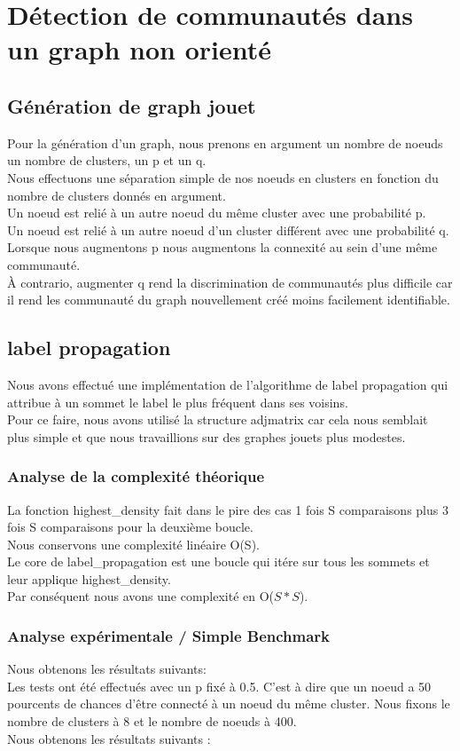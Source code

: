 \documentclass[a4paper,10pt]{report}
\begin{document}
\chapter{Détection de communautés dans un graph non orienté}
\section{Génération de graph jouet}
Pour la génération d'un graph, nous prenons en argument un nombre de noeuds un nombre de clusters, un p et un q.
\\
Nous effectuons une séparation simple de nos noeuds en clusters en fonction du nombre de clusters donnés en argument.
\\
Un noeud est relié à un autre noeud du même cluster avec une probabilité p.
\\
Un noeud est relié à un autre noeud d'un cluster différent avec une probabilité q.
\newline
\newline
Lorsque nous augmentons p nous augmentons la connexité au sein d'une même communauté.
\\
À contrario, augmenter q rend la discrimination de communautés plus difficile car il rend les communauté du graph nouvellement créé moins facilement identifiable.
\section{label propagation}
Nous avons effectué une implémentation de l'algorithme de label propagation qui attribue à un sommet le label le plus fréquent dans ses voisins.
\\
Pour ce faire, nous avons utilisé la structure adjmatrix car cela nous semblait plus simple et que nous travaillions sur des graphes jouets plus modestes.
\subsection{Analyse de la complexité théorique}
La fonction highest\_density fait dans le pire des cas 1 fois S comparaisons plus 3 fois S comparaisons pour la deuxième boucle. 
\\
Nous conservons une complexité linéaire O(S).
\\
Le core de label\_propagation est une boucle qui itére sur tous les sommets et leur applique highest\_density.
\\
Par conséquent nous avons une complexité en O($S*S$).
\subsection{Analyse expérimentale / Simple Benchmark}
Nous obtenons les résultats suivants:
\\
Les tests ont été effectués avec un p fixé à 0.5. C'est à dire que un noeud a 50 pourcents de chances d'être connecté à un noeud du même cluster. 
Nous fixons le nombre de clusters à 8 et le nombre de noeuds à 400.
\\
Nous obtenons les résultats suivants :\\
\end{document}
